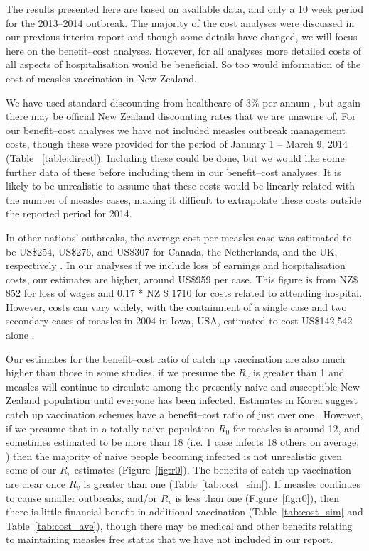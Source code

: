 \documentclass{article}
\begin{document}
The results presented here are based on available data, and only a 10 week period for the 2013--2014 outbreak. The majority of the cost analyses were discussed in our previous interim report and though some details have changed, we will focus here on the benefit--cost analyses. However, for all analyses more detailed costs of all aspects of hospitalisation would be beneficial. So too would information of the cost of measles vaccination in New Zealand.

We have used standard discounting from healthcare of 3\% per annum \citep{honeycutt6}, but again there may be official New Zealand discounting rates that we are unaware of.
For our benefit--cost analyses we have not included measles outbreak management costs, though these were provided for the period of January 1 -- March 9, 2014 (Table ~\ref{table:direct}). Including these could be done, but we would like some further data of these before including them in our benefit--cost analyses. It is likely to be unrealistic to assume that these costs would be linearly related with the number of measles cases, making it difficult to extrapolate these costs outside the reported period for 2014.

In other nations' outbreaks, the average cost per measles case was estimated to be US\$254, US\$276, and US\$307 for Canada, the Netherlands, and the UK, respectively \citep{carabin2}. In our analyses if we include loss of earnings and hospitalisation costs, our estimates are higher, around US\$959 per case. This figure is from NZ\$ 852 for loss of wages and 0.17 * NZ \$ 1710 for costs related to attending hospital. However, costs can vary widely, with the containment of a single case and two secondary cases of measles in 2004 in Iowa, USA, estimated to cost US\$142,542 alone \citep{dayan5}.

Our estimates for the benefit--cost ratio of catch up vaccination are also much higher than those in some studies, if we presume the $R_v$ is greater than 1 and measles will continue to circulate among the presently naive and susceptible New Zealand population until everyone has been infected. Estimates in Korea suggest catch up vaccination schemes have a benefit--cost ratio of just over one \citep{bae13}. However, if we presume that in a totally naive population $R_0$ for measles is around 12, and sometimes estimated to be more than 18 (i.e. 1 case infects 18 others on average, \citep{anderson91}) then the majority of naive people becoming infected is not unrealistic given some of our $R_v$ estimates (Figure~\ref{fig:r0}). The benefits of catch up vaccination are clear once $R_v$ is greater than one (Table~\ref{tab:cost_sim}). If measles continues to cause smaller outbreaks, and/or $R_v$ is less than one (Figure~\ref{fig:r0}), then there is little financial benefit in additional vaccination (Table~\ref{tab:cost_sim} and Table~\ref{tab:cost_ave}), though there may be medical and other benefits relating to maintaining measles free status that we have not included in our report.
\end{document}
